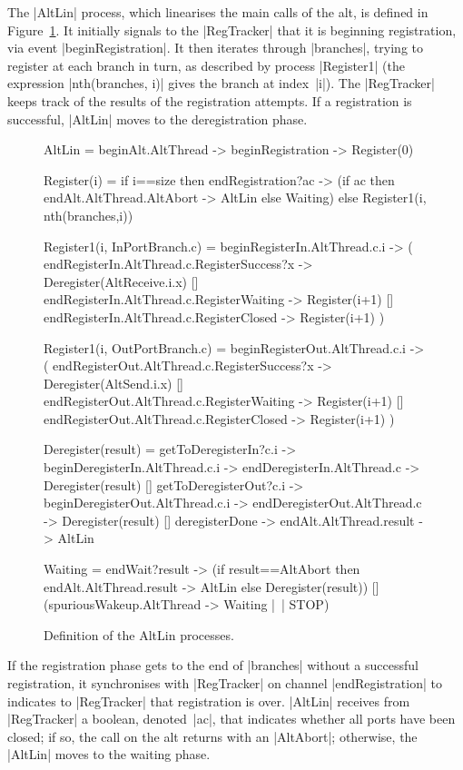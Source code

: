 The |AltLin| process, which linearises the main calls of the alt, is defined
in Figure~\ref{fig:AltLin}. It initially signals to the |RegTracker| that it
is beginning registration, via event |beginRegistration|.  It then iterates
through |branches|, trying to register at each branch in turn, as described by
process |Register1| (the expression |nth(branches, i)| gives the branch at
index~|i|).  The |RegTracker| keeps track of the results of the registration
attempts.  If a registration is successful, |AltLin| moves to the
deregistration phase.


\begin{figure}
\begin{cspm}
AltLin = beginAlt.AltThread -> beginRegistration -> Register(0)
  
Register(i) = 
  if i==size then endRegistration?ac -> (if ac then endAlt.AltThread.AltAbort -> AltLin else Waiting)
  else Register1(i, nth(branches,i))
  
Register1(i, InPortBranch.c) = 
  beginRegisterIn.AltThread.c.i -> (
    endRegisterIn.AltThread.c.RegisterSuccess?x -> Deregister(AltReceive.i.x)
    [] endRegisterIn.AltThread.c.RegisterWaiting -> Register(i+1)
    [] endRegisterIn.AltThread.c.RegisterClosed -> Register(i+1)
  )

Register1(i, OutPortBranch.c) =
  beginRegisterOut.AltThread.c.i -> (
    endRegisterOut.AltThread.c.RegisterSuccess?x -> Deregister(AltSend.i.x)
    [] endRegisterOut.AltThread.c.RegisterWaiting -> Register(i+1)
    [] endRegisterOut.AltThread.c.RegisterClosed -> Register(i+1)
  )
  
Deregister(result) =
  getToDeregisterIn?c.i -> beginDeregisterIn.AltThread.c.i ->
     endDeregisterIn.AltThread.c -> Deregister(result)
  [] getToDeregisterOut?c.i -> beginDeregisterOut.AltThread.c.i ->
        endDeregisterOut.AltThread.c -> Deregister(result)
  [] deregisterDone -> endAlt.AltThread.result -> AltLin
  
Waiting = 
  endWait?result -> (if result==AltAbort then endAlt.AltThread.result -> AltLin else Deregister(result))
  [] (spuriousWakeup.AltThread -> Waiting |~| STOP)
\end{cspm}
\caption{Definition of the {\scalastyle AltLin}
  processes.  \label{fig:AltLin}} 
\end{figure}


If the registration phase gets to the end of |branches| without a successful
registration, it synchronises with |RegTracker| on channel |endRegistration|
to indicates to |RegTracker| that registration is over.  |AltLin| receives
from |RegTracker| a boolean, denoted~|ac|, that indicates whether all ports
have been closed; if so, the call on the alt returns with an |AltAbort|;
otherwise, the |AltLin| moves to the waiting phase.

